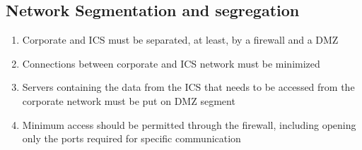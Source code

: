 \subsection{Network Segmentation and segregation}

\begin{enumerate}
   \item Corporate and ICS must be separated, at least, by a firewall and a
DMZ
   \item Connections between corporate and ICS network must be
minimized
   \item Servers containing the data from the ICS that needs to be
accessed from the corporate network must be put on DMZ
segment
   \item Minimum access should be permitted through the firewall, including
opening only the ports required for specific communication
\end{enumerate}

